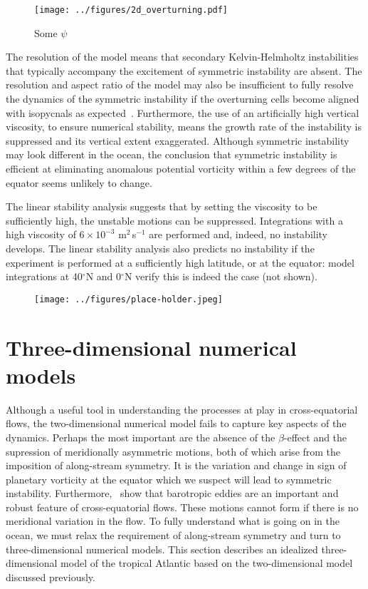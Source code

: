 \begin{figure}
    \centering
    \texttt{[image: ../figures/2d\_overturning.pdf]}
    \caption{Some $\psi$}
\end{figure}

The resolution of the model means that secondary Kelvin-Helmholtz instabilities that typically accompany the excitement of symmetric instability are absent. The resolution and aspect ratio of the model may also be insufficient to fully resolve the dynamics of the symmetric instability if the overturning cells become aligned with isopycnals as expected~\citep{Bachman2014}. Furthermore, the use of an artificially high vertical viscosity, to ensure numerical stability,  means the growth rate of the instability is suppressed and its vertical extent exaggerated. Although symmetric instability may look different in the ocean, the conclusion that symmetric instability is efficient at eliminating anomalous potential vorticity within a few degrees of the equator seems unlikely to change.

The linear stability analysis suggests that by setting the viscosity to be sufficiently high, the unstable motions can be suppressed. Integrations with a high viscosity of $6 \times 10^{-3}$ m$^2$\,s$^{-1}$ are performed and, indeed, no instability develops. The linear stability analysis also predicts no instability if the experiment is performed at a sufficiently high latitude, or at the equator: model integrations at 40$^{\circ}$N and 0$^{\circ}$N verify this is indeed the case (not shown).

\begin{figure}
    \centering
    \texttt{[image: ../figures/place-holder.jpeg]}
\end{figure}

\section{Three-dimensional numerical models}
Although a useful tool in understanding the processes at play in cross-equatorial flows, the two-dimensional numerical model fails to capture key aspects of the dynamics. Perhaps the most important are the absence of the $\beta$-effect and the supression of meridionally asymmetric motions, both of which arise from the imposition of along-stream symmetry. It is the variation and change in sign of planetary vorticity at the equator which we suspect will lead to symmetric instability. Furthermore,~\citet{Edwards1998II} show that barotropic eddies are an important and robust feature of cross-equatorial flows. These motions cannot form if there is no meridional variation in the flow. To fully understand what is going on in the ocean, we must relax the requirement of along-stream symmetry and turn to three-dimensional numerical models. This section describes an idealized three-dimensional model of the tropical Atlantic based on the two-dimensional model discussed previously.

